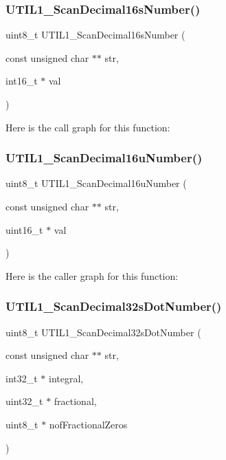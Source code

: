 \subsubsection{\texorpdfstring{U\+T\+I\+L1\+\_\+\+Scan\+Decimal16s\+Number()}{UTIL1\_ScanDecimal16sNumber()}}
{\footnotesize\ttfamily uint8\+\_\+t U\+T\+I\+L1\+\_\+\+Scan\+Decimal16s\+Number (\begin{DoxyParamCaption}\item[{const unsigned char $\ast$$\ast$}]{str,  }\item[{int16\+\_\+t $\ast$}]{val }\end{DoxyParamCaption})}

Here is the call graph for this function\+:
\mbox{\label{group___u_t_i_l1__module_ga72ae8610f443363e90b3af700e8b3d49}} 
\subsubsection{\texorpdfstring{U\+T\+I\+L1\+\_\+\+Scan\+Decimal16u\+Number()}{UTIL1\_ScanDecimal16uNumber()}}
{\footnotesize\ttfamily uint8\+\_\+t U\+T\+I\+L1\+\_\+\+Scan\+Decimal16u\+Number (\begin{DoxyParamCaption}\item[{const unsigned char $\ast$$\ast$}]{str,  }\item[{uint16\+\_\+t $\ast$}]{val }\end{DoxyParamCaption})}

Here is the caller graph for this function\+:
\mbox{\label{group___u_t_i_l1__module_ga0061e88b3fe23c58d0cb642e361c150a}} 
\subsubsection{\texorpdfstring{U\+T\+I\+L1\+\_\+\+Scan\+Decimal32s\+Dot\+Number()}{UTIL1\_ScanDecimal32sDotNumber()}}
{\footnotesize\ttfamily uint8\+\_\+t U\+T\+I\+L1\+\_\+\+Scan\+Decimal32s\+Dot\+Number (\begin{DoxyParamCaption}\item[{const unsigned char $\ast$$\ast$}]{str,  }\item[{int32\+\_\+t $\ast$}]{integral,  }\item[{uint32\+\_\+t $\ast$}]{fractional,  }\item[{uint8\+\_\+t $\ast$}]{nof\+Fractional\+Zeros }\end{DoxyParamCaption})}

